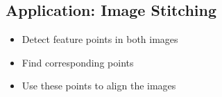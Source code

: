 \documentclass[letterpaper,12pt]{article}
\begin{document}
\subsection{Application: Image Stitching}
\begin{itemize}
 \item Detect feature points in both images
 \item Find corresponding points
 \item Use these points to align the images
\end{itemize}
\end{document}
